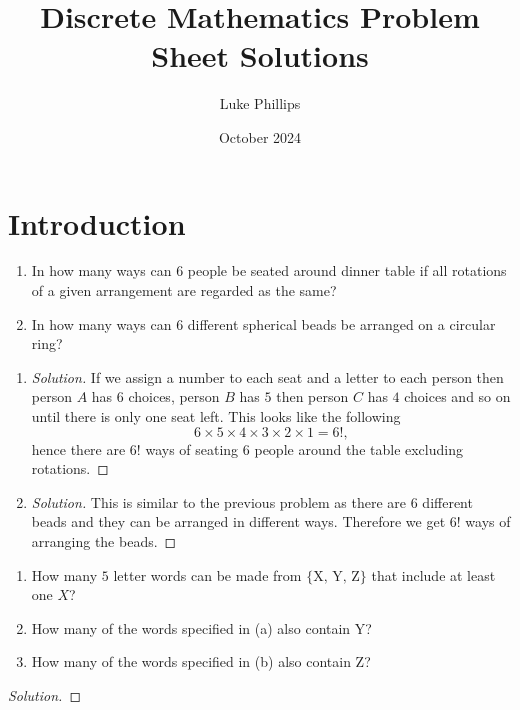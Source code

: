 \documentclass[10pt, a4paper]{article}
\title{Discrete Mathematics Problem Sheet Solutions}
\author{Luke Phillips}
\date{October 2024}
\begin{document}
\maketitle

\newpage

\section{Introduction}

\begin{problem}[Q10]\phantom{}
    \begin{enumerate}[label = (\alph*)]
        \item In how many ways can $6$ people be seated around dinner table if all rotations of a given arrangement are regarded as the same?
        \item In how many ways can $6$ different spherical beads be arranged on a circular ring?
    \end{enumerate}
    \begin{enumerate}[label = (\alph*)]
        \item 
        \begin{proof}[Solution]\renewcommand{\qedsymbol}{}
            If we assign a number to each seat and a letter to each person then person $A$ has $6$ choices, person $B$ has $5$ then person $C$ has $4$ choices and so on until there is only one seat left. This looks like the following
            \[
            6 \times 5 \times 4 \times 3 \times 2 \times 1 = 6!,
            \]
            hence there are $6!$ ways of seating $6$ people around the table excluding rotations.
        \end{proof}
        \item
        \begin{proof}[Solution]\renewcommand{\qedsymbol}{}
            This is similar to the previous problem as there are $6$ different beads and they can be arranged in different ways. Therefore we get $6!$ ways of arranging the beads.
        \end{proof}
    \end{enumerate}
\end{problem}

\newpage

\begin{problem}[Q11]
    \begin{enumerate}[label = (\alph*)]
        \item How many $5$ letter words can be made from $\{\text{X, Y, Z}\}$ that include at least one $X$?
        \item How many of the words specified in (a) also contain Y?
        \item How many of the words specified in (b) also contain Z?
    \end{enumerate}

    \begin{proof}[Solution]\renewcommand{\qedsymbol}{}
        
    \end{proof}
\end{problem}
\end{document}
